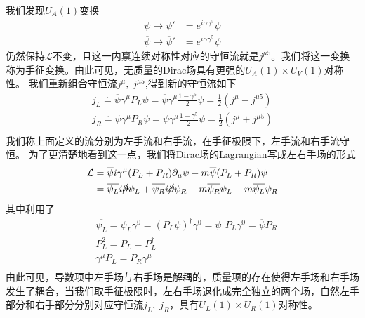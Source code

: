我们发现$U_{A}(1)$变换
\begin{equation}
    \begin{aligned}
    \psi\longrightarrow\psi'&=e^{i\alpha\gamma^{5}}\psi\\
     \overline{\psi}\longrightarrow\overline{\psi}'&=e^{i\alpha\gamma^{5}}\psi
    \end{aligned}
\end{equation}
仍然保持$\mathcal{L}$不变，且这一内禀连续对称性对应的守恒流就是$j^{\mu5}$。我们将这一变换称为手征变换。由此可见，无质量的Dirac场具有更强的$U_{A}(1)\times U_{V}(1)$对称性。
我们重新组合守恒流$j^{\mu},\;j^{\mu5}$,得到新的守恒流如下
\begin{equation}
\begin{aligned}
    j_{L}\doteq\overline{\psi}\gamma^{\mu}P_{L}\psi=\overline{\psi}\gamma^{\mu}\frac{1-\gamma^{5}}{2}\psi=\frac{1}{2}(j^{\mu}-j^{\mu5})\\
     j_{R}\doteq\overline{\psi}\gamma^{\mu}P_{R}\psi=\overline{\psi}\gamma^{\mu}\frac{1+\gamma^{5}}{2}\psi=\frac{1}{2}(j^{\mu}+j^{\mu5})\\
    \end{aligned}
\end{equation}
我们称上面定义的流分别为左手流和右手流，在手征极限下，左手流和右手流守恒。
为了更清楚地看到这一点，我们将Dirac场的Lagrangian写成左右手场的形式
\begin{equation}
    \begin{aligned}
        \mathcal{L}&=\overline{\psi}i\gamma^{\mu}(P_{L}+P_{R})\partial_{\mu}\psi-m\overline{\psi}(P_{L}+P_{R})\psi\\
        &=\overline{\psi_{L}}i\cancel{\partial}\psi_{L}+\overline{\psi_{R}}i\cancel{\partial}\psi_{R}-m\overline{\psi_{R}}\psi_{L}-m\overline{\psi_{L}}\psi_{R}
    \end{aligned}
\end{equation}
其中利用了
\begin{equation}
\begin{aligned}
&    \overline{\psi_{L}}=\psi^{\dagger}_{L}\gamma^{0}=(P_{L}\psi)^{\dagger}\gamma^{0}=\psi^{\dagger}P_{L}\gamma^{0}=\overline{\psi}P_{R}\\
&P_{L}^{2}=P_{L}=P_{L}^{\dagger}\\
&\gamma^{\mu}P_{L}=P_{R}\gamma^{\mu}\\
    \end{aligned}
\end{equation}
由此可见，导数项中左手场与右手场是解耦的，质量项的存在使得左手场和右手场发生了耦合，当我们取手征极限时，左右手场退化成完全独立的两个场，自然左手部分和右手部分分别对应守恒流$j_{L},\;j_{R}$，具有$U_{L}(1)\times U_{R}(1)$对称性。


